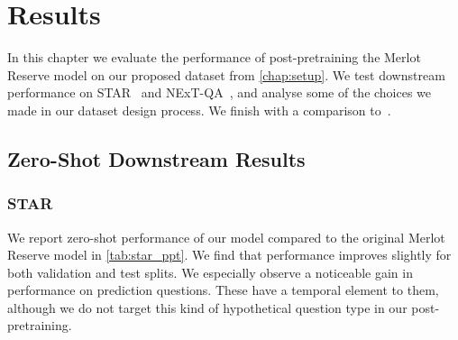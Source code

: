 \chapter{Results}
\label{chap:results}

In this chapter we evaluate the performance of post-pretraining the Merlot
Reserve model on our proposed dataset from \cref{chap:setup}. We test
downstream performance on STAR~\citep{wu2021star} and
NExT-QA~\citep{xiao2021nextqa}, and analyse some of the choices we made in our
dataset design process. We finish with a comparison
to~\citep{bagad2023testoftime}.

\section{Zero-Shot Downstream Results}
\label{sec:star_results}

\subsection{STAR}
\label{sec:star_results}

We report zero-shot performance of our model compared to the original Merlot Reserve
model in \cref{tab:star_ppt}. We find that performance improves slightly for both
validation and test splits. We especially observe a noticeable gain in performance
on prediction questions. These have a temporal element to them, although we do not
target this kind of hypothetical question type in our post-pretraining.

